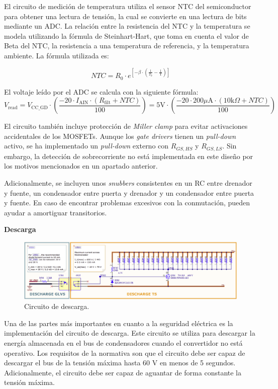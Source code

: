 El circuito de medición de temperatura utiliza el sensor NTC del semiconductor para obtener una lectura de tensión, la cual se convierte en una lectura de bits mediante un ADC. La relación entre la resistencia del NTC y la temperatura se modela utilizando la fórmula de Steinhart-Hart, que toma en cuenta el valor de Beta del NTC, la resistencia a una temperatura de referencia, y la temperatura ambiente. La fórmula utilizada es:

\[
NTC = R_0 \cdot e^{\left[-\beta \cdot \left(\frac{1}{T_0} - \frac{1}{\text{T}}\right)\right]}
\]

El voltaje leído por el ADC se calcula con la siguiente fórmula:
\[
V_{\text{read}} = V_{\text{CC\_GD}} \cdot \left(\frac{-20 \cdot I_{\text{AIN}} \cdot (R_{\text{filt}} + NTC)}{100}\right) = 5 \text{V} \cdot \left(\frac{-20 \cdot 200 \mu\text{A} \cdot (10 \text{k}\Omega + NTC)}{100}\right)
\]

El circuito también incluye protección de \textit{Miller clamp} para evitar activaciones accidentales de los MOSFETs. Aunque los \textit{gate drivers} tienen un \textit{pull-down} activo, se ha implementado un \textit{pull-down} externo con $R_{GS,HS}$ y $R_{GS,LS}$. Sin embargo, la detección de sobrecorriente no está implementada en este diseño por los motivos mencionados en un apartado anterior.

Adicionalmente, se incluyen unos \textit{snubbers} consistentes en un RC entre drenador y fuente, un condensador entre puerta y drenador y un condensador entre puerta y fuente. En caso de encontrar problemas excesivos con la conmutación, pueden ayudar a amortiguar transitorios.


\textbf{Descarga}
\begin{figure}[H]
	\centering
	\includegraphics[width=0.9\linewidth]{fig/discharge-sch}
	\caption{Circuito de descarga.}
\end{figure}

Una de las partes más importantes en cuanto a la seguridad eléctrica es la implementación del circuito de descarga. Este circuito se utiliza para descargar la energía almacenada en el bus de condensadores cuando el convertidor no está operativo. Los requisitos de la normativa son que el circuito debe ser capaz de descargar el bus de la tensión máxima hasta 60 V en menos de 5 segundos. Adicionalmente, el circuito debe ser capaz de aguantar de forma constante la tensión máxima.

